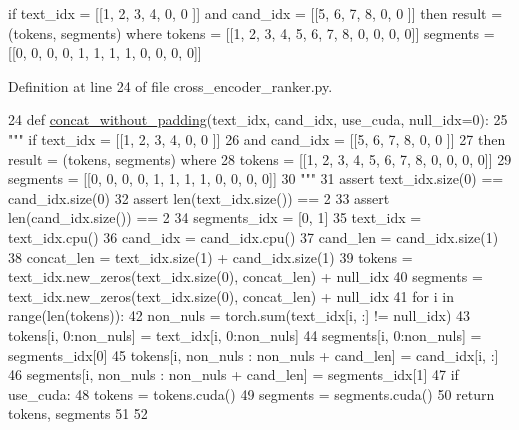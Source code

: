 \begin{DoxyVerb}if text_idx = [[1, 2, 3, 4, 0, 0  ]]
        and cand_idx = [[5, 6, 7, 8, 0, 0 ]]
        then result = (tokens, segments) where
        tokens = [[1, 2, 3, 4, 5, 6, 7, 8, 0, 0, 0, 0]]
        segments = [[0, 0, 0, 0, 1, 1, 1, 1, 0, 0, 0, 0]]\end{DoxyVerb}
 

Definition at line 24 of file cross\+\_\+encoder\+\_\+ranker.\+py.


\begin{DoxyCode}
24 \textcolor{keyword}{def }\hyperlink{namespaceparlai_1_1agents_1_1bert__ranker_1_1cross__encoder__ranker_a3914765cd62574f6f077c6e2e0070ab4}{concat\_without\_padding}(text\_idx, cand\_idx, use\_cuda, null\_idx=0):
25     \textcolor{stringliteral}{""" if text\_idx = [[1, 2, 3, 4, 0, 0  ]]}
26 \textcolor{stringliteral}{            and cand\_idx = [[5, 6, 7, 8, 0, 0 ]]}
27 \textcolor{stringliteral}{            then result = (tokens, segments) where}
28 \textcolor{stringliteral}{            tokens = [[1, 2, 3, 4, 5, 6, 7, 8, 0, 0, 0, 0]]}
29 \textcolor{stringliteral}{            segments = [[0, 0, 0, 0, 1, 1, 1, 1, 0, 0, 0, 0]]}
30 \textcolor{stringliteral}{        """}
31     \textcolor{keyword}{assert} text\_idx.size(0) == cand\_idx.size(0)
32     \textcolor{keyword}{assert} len(text\_idx.size()) == 2
33     \textcolor{keyword}{assert} len(cand\_idx.size()) == 2
34     segments\_idx = [0, 1]
35     text\_idx = text\_idx.cpu()
36     cand\_idx = cand\_idx.cpu()
37     cand\_len = cand\_idx.size(1)
38     concat\_len = text\_idx.size(1) + cand\_idx.size(1)
39     tokens = text\_idx.new\_zeros(text\_idx.size(0), concat\_len) + null\_idx
40     segments = text\_idx.new\_zeros(text\_idx.size(0), concat\_len) + null\_idx
41     \textcolor{keywordflow}{for} i \textcolor{keywordflow}{in} range(len(tokens)):
42         non\_nuls = torch.sum(text\_idx[i, :] != null\_idx)
43         tokens[i, 0:non\_nuls] = text\_idx[i, 0:non\_nuls]
44         segments[i, 0:non\_nuls] = segments\_idx[0]
45         tokens[i, non\_nuls : non\_nuls + cand\_len] = cand\_idx[i, :]
46         segments[i, non\_nuls : non\_nuls + cand\_len] = segments\_idx[1]
47     \textcolor{keywordflow}{if} use\_cuda:
48         tokens = tokens.cuda()
49         segments = segments.cuda()
50     \textcolor{keywordflow}{return} tokens, segments
51 
52 
\end{DoxyCode}
